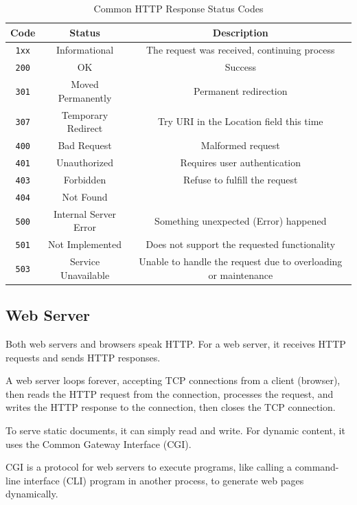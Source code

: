 \begin{table}[H]
  \centering
  \begin{tabular}{c|c|c}
      \toprule
      Code & Status & Description  \\
    \midrule
      \texttt{1xx} & Informational & The request was received, continuing process  \\
      \texttt{200} & OK & Success  \\
      \texttt{301} & Moved Permanently & Permanent redirection  \\
      \texttt{307} & Temporary Redirect & Try URI in the Location field this time  \\
      \texttt{400} & Bad Request & Malformed request  \\
      \texttt{401} & Unauthorized & Requires user authentication  \\
      \texttt{403} & Forbidden & Refuse to fulfill the request  \\
      \texttt{404} & Not Found &   \\
      \texttt{500} & Internal Server Error & Something unexpected (Error) happened  \\
      \texttt{501} & Not Implemented & Does not support the requested functionality  \\
      \texttt{503} & Service Unavailable & Unable to handle the request due to overloading or maintenance  \\
      \bottomrule
  \end{tabular}
  \caption{Common HTTP Response Status Codes}
\end{table}

\subsection{Web Server}
Both web servers and browsers speak HTTP. For a web server, it receives HTTP requests and sends HTTP responses. 

A web server loops forever, accepting TCP connections from a client (browser), then reads the HTTP request from the connection, processes the request, and writes the HTTP response to the connection, then closes the TCP connection. 

To serve static documents, it can simply read and write. For dynamic content, it uses the Common Gateway Interface (CGI). 

CGI is a protocol for web servers to execute programs, like calling a command-line interface (CLI) program in another process, to generate web pages dynamically. 

